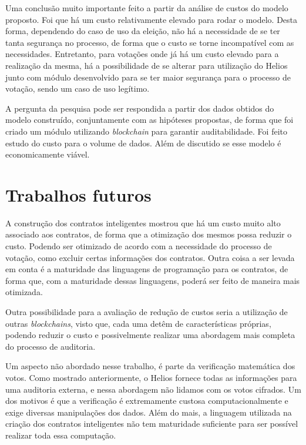 \documentclass{ufsctex/ufsctex}
\begin{document}
Uma conclusão muito importante feito a partir da análise de custos do modelo
proposto. Foi que há um custo relativamente elevado para rodar o modelo. Desta
forma, dependendo do caso de uso da eleição, não há a necessidade de se ter
tanta segurança no processo, de forma que o custo se torne incompatível com as
necessidades.  Entretanto, para votações onde já há um custo elevado para a
realização da mesma, há a possibilidade de se alterar para utilização do Helios
junto com módulo desenvolvido para se ter maior segurança para o processo de
votação, sendo um caso de uso legítimo.

A pergunta da pesquisa pode ser respondida a partir dos dados obtidos do modelo
construído, conjuntamente com as hipóteses propostas, de forma que foi criado
um módulo utilizando \textit{blockchain} para garantir auditabilidade. Foi feito
estudo do custo para o volume de dados. Além de discutido se esse modelo é
economicamente viável.

\section{Trabalhos futuros} 

A construção dos contratos inteligentes mostrou que há um custo muito alto
associado aos contratos, de forma que a otimização dos mesmos possa reduzir o
custo. Podendo ser otimizado de acordo com a necessidade do processo de
votação, como excluir certas informações dos contratos. Outra coisa a ser
levada em conta é a maturidade das linguagens de programação para os contratos,
de forma que, com a maturidade dessas linguagens, poderá ser feito de maneira
mais otimizada.

Outra possibilidade para a avaliação de redução de custos seria a utilização de
outras \textit{blockchains}, visto que, cada uma detêm de características
próprias, podendo reduzir o custo e possivelmente realizar uma abordagem mais
completa do processo de auditoria.

Um aspecto não abordado nesse trabalho, é parte da verificação matemática dos
votos. Como mostrado anteriormente, o Helios fornece todas as informações para
uma auditoria externa, e nessa abordagem não lidamos com os votos cifrados.  Um
dos motivos é que a verificação é extremamente custosa computacionalmente e
exige diversas manipulações dos dados. Além do mais, a linguagem utilizada na
criação dos contratos inteligentes não tem maturidade suficiente para ser
possível realizar toda essa computação.
\end{document}
